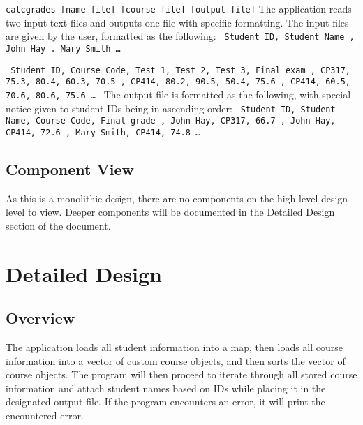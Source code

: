 \documentclass{article}
\begin{document}
\texttt{calcgrades [name file] [course file] [output file]}
\newline \newline
The application reads two input text files and outputs one file with specific formatting.
The input files are given by the user, formatted as the following:
\texttt{  \newline
  Student ID, Student Name , John Hay . Mary Smith \newline
  \ldots
}

\texttt{  \newline
  Student ID, Course Code, Test 1, Test 2, Test 3, Final exam , CP317, 75.3, 80.4, 60.3, 70.5 , CP414, 80.2, 90.5, 50.4, 75.6 , CP414, 60.5, 70.6, 80.6, 75.6 \newline
  \ldots
}
\newline \newline
The output file is formatted as the following, with special notice given to student IDs being in ascending order:
\texttt{  \newline
  Student ID, Student Name, Course Code, Final grade , John Hay, CP317, 66.7 , John Hay, CP414, 72.6 , Mary Smith, CP414, 74.8 \newline
  \ldots
}
\subsection{Component View}
As this is a monolithic design, there are no components on the high-level design level to view. Deeper components will be documented in the Detailed Design section of the document.

\section{Detailed Design}
\subsection{Overview}
The application loads all student information into a map, then loads all course information into a vector of custom course objects, and then sorts the vector of course objects. The program will then proceed to iterate through all stored course information and attach student names based on IDs while placing it in the designated output file. If the program encounters an error, it will print the encountered error.
\end{document}
